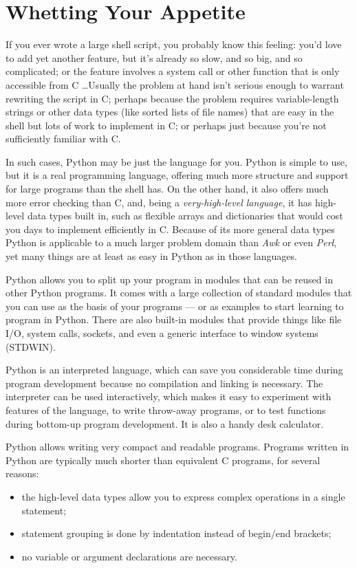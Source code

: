 

\chapter{Whetting Your Appetite}

If you ever wrote a large shell script, you probably know this
feeling: you'd love to add yet another feature, but it's already so
slow, and so big, and so complicated; or the feature involves a system
call or other function that is only accessible from C \ldots  Usually
the problem at hand isn't serious enough to warrant rewriting the
script in C; perhaps because the problem requires variable-length
strings or other data types (like sorted lists of file names) that are
easy in the shell but lots of work to implement in C; or perhaps just
because you're not sufficiently familiar with C.

In such cases, Python may be just the language for you.  Python is
simple to use, but it is a real programming language, offering much
more structure and support for large programs than the shell has.  On
the other hand, it also offers much more error checking than C, and,
being a {\em very-high-level language}, it has high-level data types
built in, such as flexible arrays and dictionaries that would cost you
days to implement efficiently in C.  Because of its more general data
types Python is applicable to a much larger problem domain than {\em
Awk} or even {\em Perl}, yet many things are at least as easy in
Python as in those languages.

Python allows you to split up your program in modules that can be
reused in other Python programs.  It comes with a large collection of
standard modules that you can use as the basis of your programs --- or
as examples to start learning to program in Python.  There are also
built-in modules that provide things like file I/O, system calls,
sockets, and even a generic interface to window systems (STDWIN).

Python is an interpreted language, which can save you considerable time
during program development because no compilation and linking is
necessary.  The interpreter can be used interactively, which makes it
easy to experiment with features of the language, to write throw-away
programs, or to test functions during bottom-up program development.
It is also a handy desk calculator.

Python allows writing very compact and readable programs.  Programs
written in Python are typically much shorter than equivalent C
programs, for several reasons:
\begin{itemize}
\item
the high-level data types allow you to express complex operations in a
single statement;
\item
statement grouping is done by indentation instead of begin/end
brackets;
\item
no variable or argument declarations are necessary.
\end{itemize}

